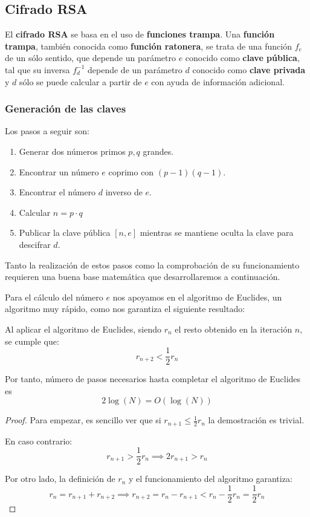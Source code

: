 \documentclass[nochap]{apuntesURJC}
\begin{document}
\subsection{Cifrado RSA}
El \textbf{cifrado RSA} se basa en el uso de \textbf{funciones trampa}. Una \textbf{función trampa}, también conocida como \textbf{función ratonera}, se trata de una función $f_e$ de un sólo sentido, que depende un parámetro $e$ conocido como \textbf{clave pública}, tal que su inversa $f_d^{-1}$ depende de un parámetro $d$ conocido como \textbf{clave privada} y $d$ sólo se puede calcular a partir de $e$ con ayuda de información adicional.

\subsubsection{Generación de las claves}
Los pasos a seguir son:
\begin{enumerate}
\item Generar dos números primos $p,q$ grandes.

\item Encontrar un número $e$ coprimo con $(p-1)(q-1)$.

\item Encontrar el número $d$ inverso de $e$.

\item Calcular $n=p\cdot q$

\item Publicar la clave pública $[n,e]$ mientras se mantiene oculta la clave para descifrar $d$.
\end{enumerate}

Tanto la realización de estos pasos como la comprobación de su funcionamiento requieren una buena base matemática que desarrollaremos a continuación.

Para el cálculo del número $e$ nos apoyamos en el algoritmo de Euclides, un algoritmo muy rápido, como nos garantiza el siguiente resultado:

\begin{lemma}
Al aplicar el algoritmo de Euclides, siendo $r_n$ el resto obtenido en la iteración $n$, se cumple que:
\[r_{n+2} < \frac{1}{2}r_n\]

Por tanto, número de pasos necesarios hasta completar el algoritmo de Euclides es
\[2\log(N)=O(\log(N))\]
\end{lemma}

\begin{proof}
Para empezar, es sencillo ver que si $r_{n+1} \leq \frac{1}{2}r_n$ la demostración es trivial.

En caso contrario:
\[r_{n+1} > \frac{1}{2} r_n \implies 2r_{n+1} > r_n\]

Por otro lado, la definición de $r_n$ y el funcionamiento del algoritmo garantiza:
\[r_n = r_{n+1} + r_{n+2} \implies r_{n+2} = r_n-r_{n+1} < r_n-\frac{1}{2}r_n = \frac{1}{2}r_n\]
\end{proof}
\end{document}
